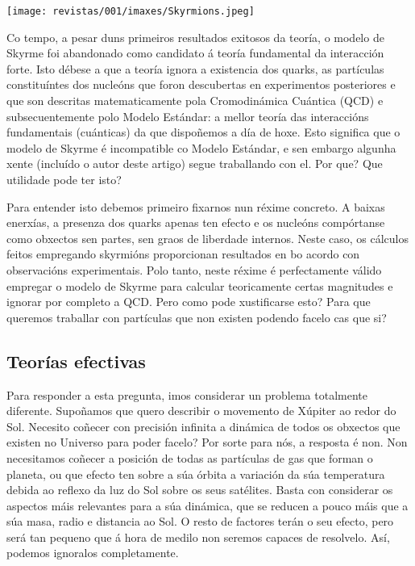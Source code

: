 \begin{multicols}{2}
\begin{center}
    \texttt{[image: revistas/001/imaxes/Skyrmions.jpeg]}
\end{center}

Co tempo, a pesar duns primeiros resultados exitosos da teoría, o modelo de
Skyrme foi abandonado como candidato á teoría fundamental da interacción forte.
Isto débese a que a teoría ignora a existencia dos quarks, as partículas
constituíntes dos nucleóns que foron descubertas en experimentos posteriores e
que son descritas matematicamente pola Cromodinámica Cuántica (QCD) e
subsecuentemente polo Modelo Estándar: a mellor teoría das interaccións
fundamentais (cuánticas) da que dispoñemos a día de hoxe. Esto significa que o
modelo de Skyrme é incompatible co Modelo Estándar, e sen embargo algunha xente
(incluído o autor deste artigo) segue traballando con el. Por que? Que
utilidade pode ter isto?

Para entender isto debemos primeiro fixarnos nun réxime concreto. A baixas
enerxías, a presenza dos quarks apenas ten efecto e os nucleóns compórtanse
como obxectos sen partes, sen graos de liberdade internos. Neste caso, os
cálculos feitos empregando skyrmións proporcionan resultados en bo acordo con
observacións experimentais. Polo tanto, neste réxime é perfectamente válido
empregar o modelo de Skyrme para calcular teoricamente certas magnitudes e
ignorar por completo a QCD. Pero como pode xustificarse esto? Para que queremos
traballar con partículas que non existen podendo facelo cas que si?

\subsection*{Teorías efectivas}

Para responder a esta pregunta, imos considerar
un problema totalmente diferente. Supoñamos que quero describir o movemento de
Xúpiter ao redor do Sol. Necesito coñecer con precisión infinita a dinámica de
todos os obxectos que existen no Universo para poder facelo? Por sorte para
nós, a resposta é non. Non necesitamos coñecer a posición de todas as
partículas de gas que forman o planeta, ou que efecto ten sobre a súa órbita a
variación da súa temperatura debida ao reflexo da luz do Sol sobre os seus
satélites. Basta con considerar os aspectos máis relevantes para a súa
dinámica, que se reducen a pouco máis que a súa masa, radio e distancia ao Sol.
O resto de factores terán o seu efecto, pero será tan pequeno que á hora de
medilo non seremos capaces de resolvelo. Así, podemos ignoralos completamente.


\end{multicols}
